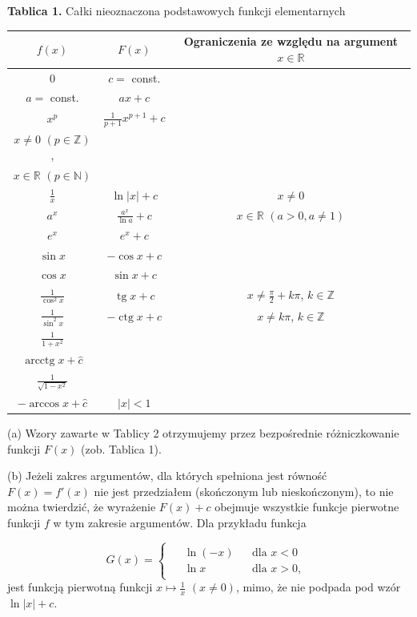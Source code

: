 \documentclass[leqno]{article}
\DeclareMathOperator{\tg}{\text{tg}}
\DeclareMathOperator{\ctg}{\text{ctg}}
\DeclareMathOperator{\arctg}{\text{arctg}}
\DeclareMathOperator{\arcctg}{\text{arcctg}}
\begin{document}
\begin{justify}
\newpage
\textbf{Tablica 1.} Całki nieoznaczona podstawowych funkcji elementarnych

\noindent
\begin{tabular}{|c|c|c|}
    \hline
    $f(x)$ & $F(x)$ & Ograniczenia ze względu na argument $x \in \mathbb{R}$ \\
    \hline
    0 & $c = $ const. & \\
    \hline
    $a = $ const. & $ax + c$ &  \\
    \hline
    $x^p$ & $\frac{1}{p+1}x^{p+1} + c$ & \makecell{$p \neq -1, x > 0$ $(p \in \mathbb{R})$, \\ $x \neq 0$ $(p \in \mathbb{Z})$, \\ $x \in \mathbb{R}$ $(p \in \mathbb{N})$}\\
    \hline
    $\frac{1}{x}$ & $\ln{|x|} + c$ & $x \neq 0$ \\
    \hline
    $a^x$ & $\frac{a^x}{\ln{a}} + c$ & $x \in \mathbb{R}$ $(a >0, a \neq 1)$ \\
    \hline
    $e^x$ & $e^x + c$ &  \\
    \hline
    $\sin{x}$ & $-\cos{x} + c$ & \\
    \hline
    $\cos{x}$ & $\sin{x} + c$ & \\
    \hline
    $\frac{1}{\cos^2{x}}$ & $\tg{x} + c$ & $x \neq \frac{\pi}{2} + k\pi$, $k \in \mathbb{Z}$ \\
    \hline
    $\frac{1}{\sin^2{x}}$ & $-\ctg{x} + c $& $ x \neq k\pi$, $k \in \mathbb{Z}$ \\
    \hline
    $\frac{1}{1+x^2}$ & \makecell{$\arctg{x} + c$ \\ $\arcctg{x} + \hat{c}$} & \\
    \hline
    $\frac{1}{\sqrt{1 - x^2}}$ & \makecell{$\arcsin{x} + c$ \\ $-\arccos{x} + \hat{c}$} & $|x| < 1$ \\
    \hline
\end{tabular}

\begin{uwaga}
    (a) Wzory zawarte w Tablicy 2 otrzymujemy przez bezpośrednie różniczkowanie funkcji $F(x)$ (zob. Tablica 1).

    \noindent
    (b) Jeżeli zakres argumentów, dla których spełniona jest równość $F(x) = f'(x)$ nie jest przedziałem
    (skończonym lub nieskończonym), to nie można twierdzić, że wyrażenie $F(x) + c$ obejmuje wszystkie funkcje pierwotne funkcji $f$
    w tym zakresie argumentów. Dla przykładu funkcja

    \[
        G(x) =
            \begin{cases}
                \begin{aligned}
                    &\ln(-x) & &\text{dla } x < 0 \\
                    &\ln{x} & &\text{dla } x > 0,
                \end{aligned}
            \end{cases}
    \]
    jest funkcją pierwotną funkcji $x \mapsto \frac{1}{x}$ $(x \neq 0)$, mimo, że nie podpada pod
    wzór $\ln|x| + c$. 
\end{uwaga}


\end{justify}
\end{document}
